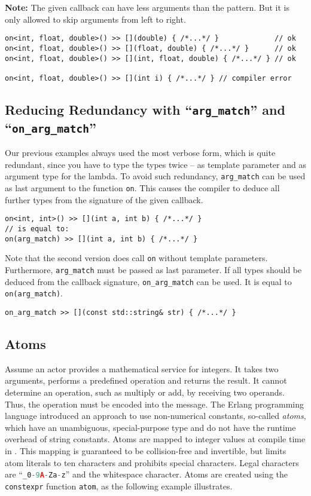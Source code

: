 \textbf{Note:} The given callback can have less arguments than the pattern.
But it is only allowed to skip arguments from left to right.

\begin{lstlisting}
on<int, float, double>() >> [](double) { /*...*/ }             // ok
on<int, float, double>() >> [](float, double) { /*...*/ }      // ok
on<int, float, double>() >> [](int, float, double) { /*...*/ } // ok

on<int, float, double>() >> [](int i) { /*...*/ } // compiler error
\end{lstlisting}

\subsection{Reducing Redundancy with ``\lstinline^arg_match^'' and ``\lstinline^on_arg_match^''}

Our previous examples always used the most verbose form, which is quite redundant, since you have to type the types twice -- as template parameter and as argument type for the lambda.
To avoid such redundancy, \lstinline^arg_match^ can be used as last argument to the function \lstinline^on^.
This causes the compiler to deduce all further types from the signature of the given callback.

\begin{lstlisting}
on<int, int>() >> [](int a, int b) { /*...*/ }
// is equal to:
on(arg_match) >> [](int a, int b) { /*...*/ }
\end{lstlisting}

Note that the second version does call \lstinline^on^ without template parameters.
Furthermore, \lstinline^arg_match^ must be passed as last parameter.
If all types should be deduced from the callback signature, \lstinline^on_arg_match^ can be used.
It is equal to \lstinline^on(arg_match)^.

\begin{lstlisting}
on_arg_match >> [](const std::string& str) { /*...*/ }
\end{lstlisting}

\subsection{Atoms}
\label{Sec::PatternMatching::Atoms}

Assume an actor provides a mathematical service for integers.
It takes two arguments, performs a predefined operation and returns the result.
It cannot determine an operation, such as multiply or add, by receiving two operands.
Thus, the operation must be encoded into the message.
The Erlang programming language introduced an approach to use non-numerical
constants, so-called \textit{atoms}, which have an unambiguous, special-purpose type and do not have the runtime overhead of string constants.
Atoms are mapped to integer values at compile time in \libcppa.
This mapping is guaranteed to be collision-free and invertible, but limits atom literals to ten characters and prohibits special characters.
Legal characters are ``\lstinline[language=C++]^_0-9A-Za-z^'' and the whitespace character.
Atoms are created using the \lstinline^constexpr^ function \lstinline^atom^, as the following example illustrates.

